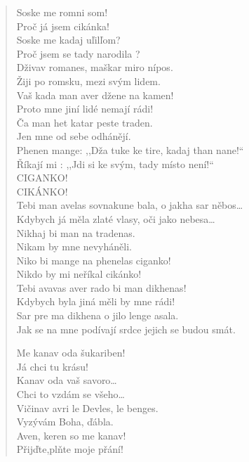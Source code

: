 \begin{verse}
Soske me  romni som! \\
Proč já jsem cikánka! \\
Soske me kadaj uľilľom? \\
Proč jsem se tady narodila ? \\
Dživav romanes, maškar miro nípos. \\ 
Žiji po romsku, mezi svým lidem. \\
Vaš kada man aver džene na kamen! \\
Proto mne jiní lidé nemají rádi! \\
Ča man het katar peste traden. \\
Jen mne od sebe odhánějí. \\
Phenen mange: ,,Dža tuke ke tire, kadaj than nane!`` \\
Říkají mi : ,,Jdi si ke svým, tady místo není!`` \\
CIGANKO! \\
CIKÁNKO! \\
Tebi man avelas sovnakune bala, o jakha sar něbos\ldots \\
Kdybych já měla zlaté vlasy, oči jako nebesa\ldots \\
Nikhaj bi man na tradenas. \\
Nikam by mne nevyháněli. \\
Niko bi mange na phenelas ciganko! \\
Nikdo by mi neříkal cikánko! \\
Tebi avavas aver rado bi man dikhenas! \\
Kdybych byla jiná měli by mne rádi! \\
Sar pre ma dikhena o jilo lenge asala. \\
Jak se na mne podívají srdce jejich se budou smát.

\medskip

Me kanav oda šukariben! \\
Já chci tu krásu! \\
Kanav oda vaš savoro\ldots \\
Chci to vzdám se všeho\ldots \\
Vičinav avri le Devles, le benges. \\
Vyzývám Boha, ďábla. \\
Aven, keren so me kanav! \\
Přijďte,plňte moje přání!

\medskip


\end{verse}
